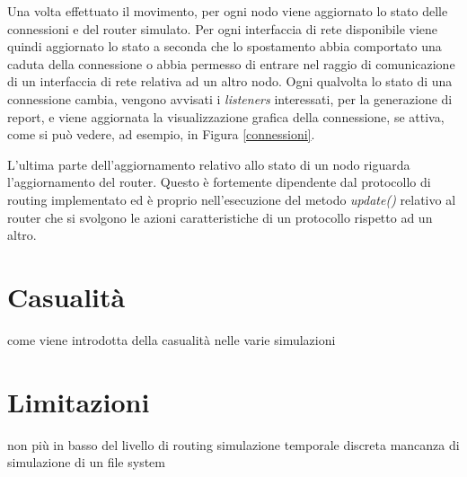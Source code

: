 Una volta effettuato il movimento, per ogni nodo viene aggiornato lo stato delle connessioni e del router simulato. Per ogni interfaccia di rete disponibile viene quindi aggiornato lo stato a seconda che lo spostamento abbia comportato una caduta della connessione o abbia permesso di entrare nel raggio di comunicazione di un interfaccia di rete relativa ad un altro nodo. Ogni qualvolta lo stato di una connessione cambia, vengono avvisati i \textit{listeners} interessati, per la generazione di report, e viene aggiornata la visualizzazione grafica della connessione, se attiva, come si può vedere, ad esempio, in Figura \ref{connessioni}.
\\

L'ultima parte dell'aggiornamento relativo allo stato di un nodo riguarda l'aggiornamento del router. Questo è fortemente dipendente dal protocollo di routing implementato ed è proprio nell'esecuzione del metodo \textit{update()} relativo al router che si svolgono le azioni caratteristiche di un protocollo rispetto ad un altro.

\section{Casualità}
come viene introdotta della casualità nelle varie simulazioni

\section{Limitazioni}
non più in basso del livello di routing
simulazione temporale discreta
mancanza di simulazione di un file system


